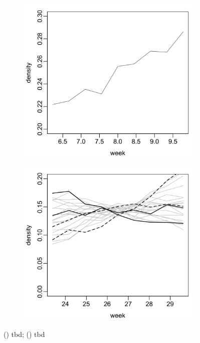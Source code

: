 \documentclass{uwstat572}
\begin{document}
\begin{figure}[H]
	\centering
	\begin{subfigure}[b]{0.49\textwidth}
		\includegraphics[width=\textwidth]{figures/figure_3a.png}
		\caption{}
		\label{fig:first_infections}
	\end{subfigure}
	\hfill
	\begin{subfigure}[b]{0.49\textwidth}
		\includegraphics[width=\textwidth]{figures/figure_3b.png}
		\caption{}
		\label{fig:last_infections}
	\end{subfigure}
	\caption{() tbd; () tbd }
	\label{fig:data_plot}
\end{figure} 
\end{document}
